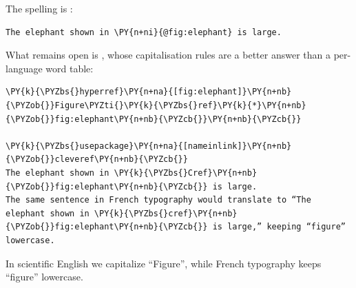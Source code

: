 \documentclass[a4paper,twoside]{article}
\begin{document}
The spelling is :
\begin{tscode}[lang=markdown, engine=pygments]
\begin{Verbatim}[commandchars=\\\{\},breaklines, breakanywhere, commandchars=\\\{\}]
The elephant shown in \PY{n+ni}{@fig:elephant} is large.
\end{Verbatim}
\end{tscode}
What remains open is , whose capitalisation rules are a better answer
than a per-language word table:
\begin{tscode}[lang=latex, engine=pygments]
\begin{Verbatim}[commandchars=\\\{\},breaklines, breakanywhere, commandchars=\\\{\}]
\PY{k}{\PYZbs{}hyperref}\PY{n+na}{[fig:elephant]}\PY{n+nb}{\PYZob{}}Figure\PYZti{}\PY{k}{\PYZbs{}ref}\PY{k}{*}\PY{n+nb}{\PYZob{}}fig:elephant\PY{n+nb}{\PYZcb{}}\PY{n+nb}{\PYZcb{}}

\PY{k}{\PYZbs{}usepackage}\PY{n+na}{[nameinlink]}\PY{n+nb}{\PYZob{}}cleveref\PY{n+nb}{\PYZcb{}}
The elephant shown in \PY{k}{\PYZbs{}Cref}\PY{n+nb}{\PYZob{}}fig:elephant\PY{n+nb}{\PYZcb{}} is large.
The same sentence in French typography would translate to “The elephant shown in \PY{k}{\PYZbs{}cref}\PY{n+nb}{\PYZob{}}fig:elephant\PY{n+nb}{\PYZcb{}} is large,” keeping “figure” lowercase.
\end{Verbatim}
\end{tscode}
In scientific English we capitalize ``Figure'', while French typography keeps ``figure'' lowercase.
\end{document}
